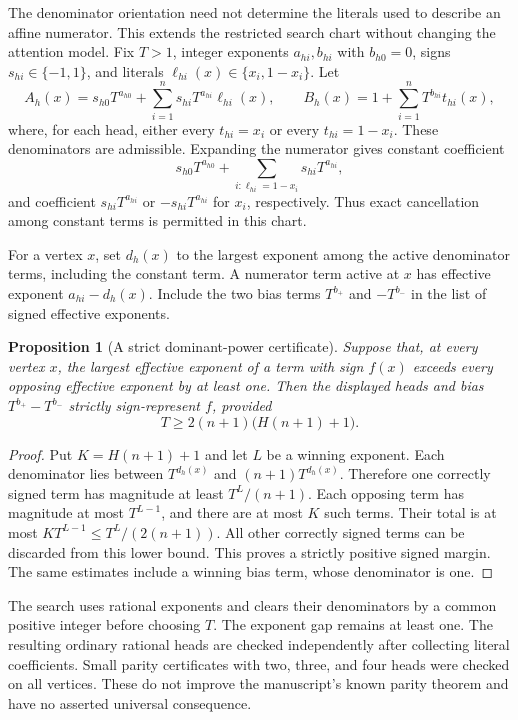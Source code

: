 \documentclass[11pt]{article}
\newtheorem{proposition}{Proposition}
\begin{document}
The denominator orientation need not determine the literals used to
describe an affine numerator. This extends the restricted search chart
without changing the attention model. Fix $T>1$, integer exponents
$a_{hi},b_{hi}$ with $b_{h0}=0$, signs $s_{hi}\in\{-1,1\}$,
and literals $\ell_{hi}(x)\in\{x_i,1-x_i\}$. Let
\[
 A_h(x)=s_{h0}T^{a_{h0}}+
       \sum_{i=1}^n s_{hi}T^{a_{hi}}\ell_{hi}(x),\qquad
 B_h(x)=1+\sum_{i=1}^n T^{b_{hi}}t_{hi}(x),
\]
where, for each head, either every $t_{hi}=x_i$ or every
$t_{hi}=1-x_i$. These denominators are admissible. Expanding the
numerator gives constant coefficient
\[
 s_{h0}T^{a_{h0}}+
 \sum_{i:\ell_{hi}=1-x_i}s_{hi}T^{a_{hi}},
\]
and coefficient $s_{hi}T^{a_{hi}}$ or $-s_{hi}T^{a_{hi}}$ for
$x_i$, respectively. Thus exact cancellation among constant terms
is permitted in this chart.

For a vertex $x$, set $d_h(x)$ to the largest exponent among the
active denominator terms, including the constant term. A numerator
term active at $x$ has effective exponent $a_{hi}-d_h(x)$. Include
the two bias terms $T^{b_+}$ and $-T^{b_-}$ in the list of signed
effective exponents.

\begin{proposition}[A strict dominant-power certificate]
Suppose that, at every vertex $x$, the largest effective exponent
of a term with sign $f(x)$ exceeds every opposing effective
exponent by at least one. Then the displayed heads and bias
$T^{b_+}-T^{b_-}$ strictly sign-represent $f$, provided
\[
 T\ge 2(n+1)\bigl(H(n+1)+1\bigr).
\]
\end{proposition}
\begin{proof}
Put $K=H(n+1)+1$ and let $L$ be a winning exponent. Each
denominator lies between $T^{d_h(x)}$ and
$(n+1)T^{d_h(x)}$. Therefore one correctly signed term has
magnitude at least $T^L/(n+1)$. Each opposing term has magnitude
at most $T^{L-1}$, and there are at most $K$ such terms. Their
total is at most $KT^{L-1}\le T^L/(2(n+1))$.
All other correctly signed terms can be discarded from this lower
bound. This proves a strictly positive signed margin. The same
estimates include a winning bias term, whose denominator is one.
\end{proof}

The search uses rational exponents and clears their denominators
by a common positive integer before choosing $T$. The exponent
gap remains at least one. The resulting ordinary rational heads
are checked independently after collecting literal coefficients.
Small parity certificates with two, three, and four heads were
checked on all vertices. These do not improve the manuscript's
known parity theorem and have no asserted universal consequence.
\end{document}
